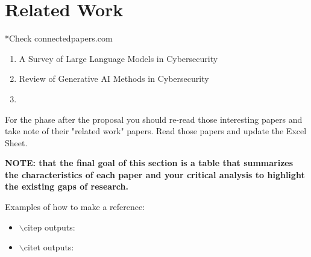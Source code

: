\section{Related Work}
\label{sec:related-work}

*Check connectedpapers.com

\begin{enumerate}
    \item A Survey of Large Language Models in Cybersecurity
    \item Review of Generative AI Methods in Cybersecurity
    \item
\end{enumerate}

For the phase after the proposal you should re-read those interesting papers and take note of their "related work" papers. Read those papers and update the Excel Sheet.

\textbf{NOTE: that the final goal of this section is a table that summarizes the characteristics of each paper and your critical analysis to highlight the existing gaps of research.}

Examples of how to make a reference:
\begin{itemize}
    \item $\backslash$citep outputs:~\citep{jjsantanna2015IM1}
    \item $\backslash$citet outputs: \citet{jjsantanna2015IM1}
\end{itemize}
